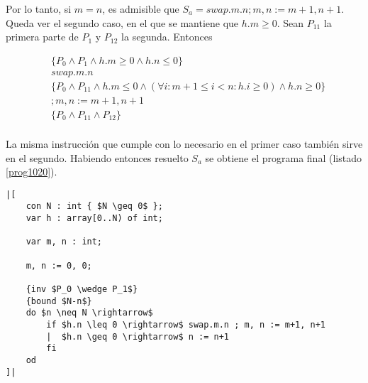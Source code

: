 \documentclass{article}
\begin{document}
Por lo tanto, si $m = n$, es admisible que $S_a = swap.m.n ; m, n := m+1, n+1$. Queda ver el
segundo caso, en el que se mantiene que $h.m \geq 0$. Sean $P_{11}$ la primera parte de $P_1$
y $P_{12}$ la segunda. Entonces

\begin{align*}
 & \{P_0 \wedge P_1 \wedge h.m \geq 0 \wedge h.n \leq 0\} \\
 & swap.m.n \\
 & \{P_0 \wedge P_{11} \wedge h.m \leq 0 \wedge (\forall i : m + 1 \leq i < n : h.i \geq 0) \wedge h.n \geq 0\} \\
 & ;m, n := m+1, n+1 \\
 & \{P_0 \wedge P_{11} \wedge P_{12}\} \\
\end{align*}

La misma instrucción que cumple con lo necesario en el primer caso también sirve en el segundo.
Habiendo entonces resuelto $S_a$ se obtiene el programa final (listado \ref{prog1020}).

\begin{lstlisting}[float,caption={Solución del ejercicio 10.2.0},label=prog1020]
|[
    con N : int { $N \geq 0$ };
    var h : array[0..N) of int;

    var m, n : int;

    m, n := 0, 0;

    {inv $P_0 \wedge P_1$}
    {bound $N-n$}
    do $n \neq N \rightarrow$
        if $h.n \leq 0 \rightarrow$ swap.m.n ; m, n := m+1, n+1
        |  $h.n \geq 0 \rightarrow$ n := n+1
        fi
    od
]|
\end{lstlisting}
\end{document}
